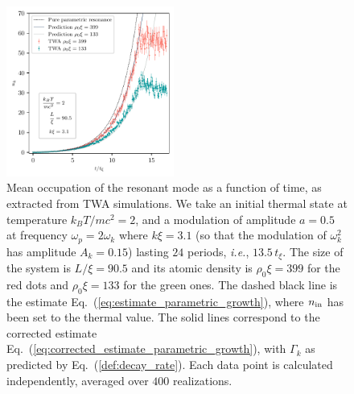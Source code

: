 \documentclass[aps,prd,notitlepage,amsfonts,amssymb,amsmath,nofootinbib,superscriptaddress,longbibliography]{revtex4-2}
\begin{document}
\begin{figure}
    \centering
    \includegraphics[width = 0.49\textwidth]{fig4.pdf}
    \caption{Mean occupation of the resonant mode as a function of time, as extracted from TWA simulations.   We take an initial thermal state at temperature $k_{B} T/m c^2 = 2$, and a modulation of amplitude $a = 0.5$ at frequency $\omega_{p} = 2 \omega_{k}$ where $k \xi = 3.1$ (so that the modulation of $\omega_{k}^{2}$ has amplitude $A_{k} = 0.15$) lasting $24$ periods, {\it i.e.}, $13.5 \, t_{\xi} $. The size of the system is $L/\xi = 90.5$ and its atomic density is $\rho_0 \xi =399$ for the red dots and $\rho_0 \xi = 133$ for the green ones. The dashed black line is the estimate Eq.~(\ref{eq:estimate_parametric_growth}), where $n_{\rm in}$ has been set to the thermal value. The solid lines correspond to the corrected estimate Eq.~(\ref{eq:corrected_estimate_parametric_growth}), with $\Gamma_{k}$ as predicted by Eq.~(\ref{def:decay_rate}). Each data point is calculated independently, averaged over $400$ realizations.
    \label{fig:n_k_parametric_amplification_reduction}}
\end{figure}
\end{document}
